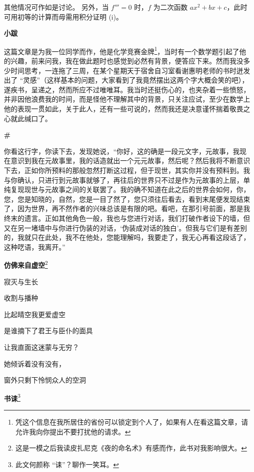 \documentclass{ctexbook}
\begin{document}
    其他情况可作如是讨论。
    另外，当 \(f''' = 0\) 时，\(f\) 为二次函数 \(ax^2 + bx + c\)，此时可用初等的计算而毋需用积分证明 (i)。

    
\mbox


    \textbf{\large 小跋}

    {\large 这篇文章是为我一位同学而作，他是化学竞赛金牌\footnote{\normalsize 凭这个信息在我所居住的省份可以锁定到个人了，如果有人在看这篇文章，请允许我向你提出不要打扰他的请求。}，当时有一个数学题引起了他的兴趣，前来问我，我在做此题时也感觉到必然有背景，便答应下来。然而我没多少时间思考，一连拖了三周，在某个星期天于宿舍自习室看谢惠明老师的书时迸发出了 “灵感”（这样基本的问题，大家看到了我竟然摆出这两个字大概会笑的吧），遂疾书，呈递之，然而所应不过唯唯耳。我当时还挺伤心的，也夹杂着一些愤怒，并非因他浪费我的时间，而是怪他不理解其中的背景，只关注应试，至少在数学上他的表现一贯如此，关于此人，还有一些可说的，然而我还是决意谨怀揣着敬畏之心就此缄口了。}

\newpage
\textbf{\#}


\mbox


    你看这行字，你读下去，发现她说，“你好，这的确是一段元文字，元故事，我现在意识到我在元故事里，我的话造就出一个元元故事，然后呢？然后我将不断意识下去，正如你所预料的那般忽然打断这过程，但于现世，其实你并没有预料到。我与你确认，只进行到元故事就够了，再往后的世界只不过是作为元故事的上层，单纯复现现世与元故事之间的关联罢了。我的确不知道在此之后的世界会如何，你，您，您是知晓的，自然，您是一目了然了，您只须往后看去，看到末尾便发现结束了，因为世界，再不然作者的兴味总该是有限的吧。看吧，在那引号前面，那是我终末的遗言。正如其他角色一般，我也与您进行对话，我们打破作者设下的墙，但又在另一堵墙中与你进行伪装的对话，‘伪装成对话的独白’。但我与它们是有差别的，我就只在此处，我不在他处，您能理解吗，我要走了，我无心再看这段话了，这种呓语，我离开。”

\newpage
\textbf{仿佛来自虚空}\footnote{\normalsize 这是一模之后我读皮扎尼克《夜的命名术》有感而作，此书对我影响很大。}


\mbox


    寂灭与生长
    
    收割与播种
    
    比起晴空我更爱虚空
    
    是谁摘下了君王与臣仆的面具
    
    让我直面这迷蒙与无穷？
    
    她倾诉着没有没有，
    
    窗外只剩下怜悯众人的空洞

\newpage
\textbf{书诔}\footnote{\normalsize 此文何颜称 “诔”？聊作一笑耳。}
\end{document}
